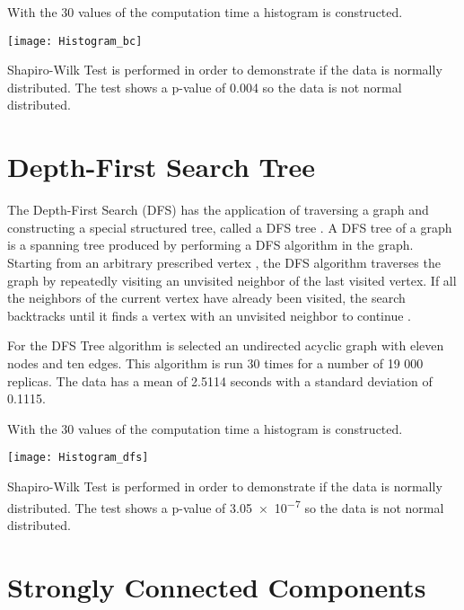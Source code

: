 \documentclass[10pt,a4paper,openany]{article}
\begin{document}
	With the 30 values of the computation time a histogram is constructed.
	
	\begin{center}
		\texttt{[image: Histogram\_bc]}
	\end{center}

	Shapiro-Wilk Test is performed in order to demonstrate if the data is normally distributed. The test shows a p-value of 0.004 so the data is not normal distributed.

\newpage
		
	\section*{Depth-First Search Tree}
		
	The Depth-First Search (DFS) has the application of traversing a graph and constructing a special structured tree, called a DFS tree \citep{korach1988dfs}. A DFS tree of a graph is a spanning tree produced by performing a DFS algorithm in the graph. Starting from an arbitrary prescribed vertex , the DFS algorithm traverses the graph by repeatedly visiting an unvisited neighbor of the last visited vertex. If all the neighbors of the current vertex have already been visited, the search backtracks until it finds a vertex with an unvisited neighbor to continue \citep{elmasry2013every}.
	
	
	
	For the DFS Tree algorithm is selected an undirected acyclic graph with eleven nodes and ten edges. This algorithm is run 30 times for a number of 19 000 replicas. The data has a mean of 2.5114 seconds with a standard deviation of 0.1115.
	
	With the 30 values of the computation time a histogram is constructed.
	
	\begin{center}
		\texttt{[image: Histogram\_dfs]}
	\end{center}
	
	Shapiro-Wilk Test is performed in order to demonstrate if the data is normally distributed. The test shows a p-value of \num{3.05e-7} so the data is not normal distributed.
	
\newpage
	
	\section*{Strongly Connected Components}
	
\end{document}
